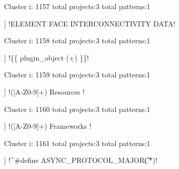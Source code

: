 Cluster i: 1157
total projects:3
total patterns:1
\begin{multicols}{1}
\begin{description}[noitemsep,topsep=0pt]
\item [[3] ] \cverb!ELEMENT FACE INTERCONNECTIVITY DATA!
\end{description}
\end{multicols}







Cluster i: 1158
total projects:3
total patterns:1
\begin{multicols}{1}
\begin{description}[noitemsep,topsep=0pt]
\item [[3] ] \cverb!\{\{ plugin_object (\d+) \}\}!
\end{description}
\end{multicols}







Cluster i: 1159
total projects:3
total patterns:1
\begin{multicols}{1}
\begin{description}[noitemsep,topsep=0pt]
\item [[3] ] \cverb!([A-Z0-9]+) \/\* Resources \*\/!
\end{description}
\end{multicols}







Cluster i: 1160
total projects:3
total patterns:1
\begin{multicols}{1}
\begin{description}[noitemsep,topsep=0pt]
\item [[3] ] \cverb!([A-Z0-9]+) \/\* Frameworks \*\/!
\end{description}
\end{multicols}







Cluster i: 1161
total projects:3
total patterns:1
\begin{multicols}{1}
\begin{description}[noitemsep,topsep=0pt]
\item [[3] ] \cverb!^#define ASYNC_PROTOCOL_MAJOR\t*(.*)!
\end{description}
\end{multicols}







